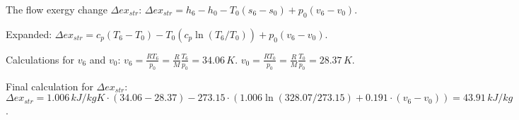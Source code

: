 The flow exergy change \( \Delta ex_{str} \):  
\( \Delta ex_{str} = h_6 - h_0 - T_0 (s_6 - s_0) + p_0 (v_6 - v_0) \).  

Expanded:  
\( \Delta ex_{str} = c_p (T_6 - T_0) - T_0 (c_p \ln(T_6 / T_0)) + p_0 (v_6 - v_0) \).  

Calculations for \( v_6 \) and \( v_0 \):  
\( v_6 = \frac{R T_6}{p_0} = \frac{R}{M} \frac{T_6}{p_0} = 34.06 \, K \).  
\( v_0 = \frac{R T_0}{p_0} = \frac{R}{M} \frac{T_0}{p_0} = 28.37 \, K \).  

Final calculation for \( \Delta ex_{str} \):  
\( \Delta ex_{str} = 1.006 \, kJ/kgK \cdot (34.06 - 28.37) - 273.15 \cdot (1.006 \ln(328.07 / 273.15) + 0.191 \cdot (v_6 - v_0)) = 43.91 \, kJ/kg \).